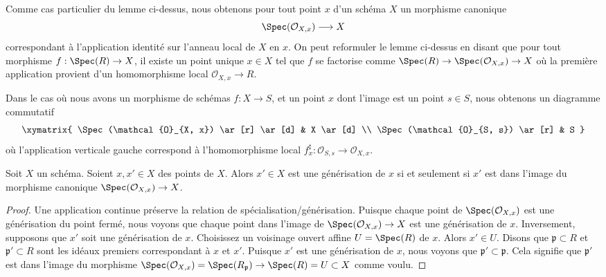 \noindent
Comme cas particulier du lemme ci-dessus, nous obtenons pour tout
point $x$ d'un schéma $X$ un morphisme canonique
\begin{equation}
\label{equation-canonical-morphism}
\Spec(\mathcal{O}_{X, x}) \longrightarrow X
\end{equation}
correspondant à l'application identité sur l'anneau local de $X$ en $x$.
On peut reformuler le lemme ci-dessus en disant que pour tout
morphisme $f : \Spec(R) \to X$, il existe un point unique $x
\in X$ tel que $f$ se factorise comme
$\Spec(R) \to \Spec(\mathcal{O}_{X, x}) \to X$ où
la première application provient d'un homomorphisme local
$\mathcal{O}_{X, x} \to R$.

\medskip\noindent
Dans le cas où nous avons un morphisme de schémas $f : X \to S$,
et un point $x$ dont l'image est un point $s \in S$, nous obtenons
un diagramme commutatif
$$
\xymatrix{
\Spec(\mathcal{O}_{X, x}) \ar[r] \ar[d] & X \ar[d] \\
\Spec(\mathcal{O}_{S, s}) \ar[r] & S
}
$$
où l'application verticale gauche correspond à l'homomorphisme local
$f^\sharp_x : \mathcal{O}_{S, s} \to \mathcal{O}_{X, x}$.

\begin{lemma}
\label{lemma-specialize-points}
Soit $X$ un schéma.
Soient $x, x' \in X$ des points de $X$.
Alors $x' \in X$ est une générisation de $x$ si et seulement
si $x'$ est dans l'image du morphisme canonique
$\Spec(\mathcal{O}_{X, x}) \to X$.
\end{lemma}

\begin{proof}
Une application continue préserve la relation de spécialisation/générisation.
Puisque chaque point de $\Spec(\mathcal{O}_{X, x})$ est une
générisation du point fermé, nous voyons que chaque point dans l'image
de $\Spec(\mathcal{O}_{X, x}) \to X$ est une générisation de $x$.
Inversement, supposons que $x'$ soit une générisation de $x$.
Choisissez un voisinage ouvert affine $U = \Spec(R)$ de $x$.
Alors $x' \in U$. Disons que $\mathfrak p \subset R$ et
$\mathfrak p' \subset R$ sont les idéaux premiers
correspondant à $x$ et $x'$. Puisque $x'$ est une générisation
de $x$, nous voyons que $\mathfrak p' \subset \mathfrak p$. Cela
signifie que $\mathfrak p'$ est dans l'image du morphisme
$\Spec(\mathcal{O}_{X, x}) = \Spec(R_{\mathfrak p})
\to \Spec(R) = U \subset X$ comme voulu.
\end{proof}

